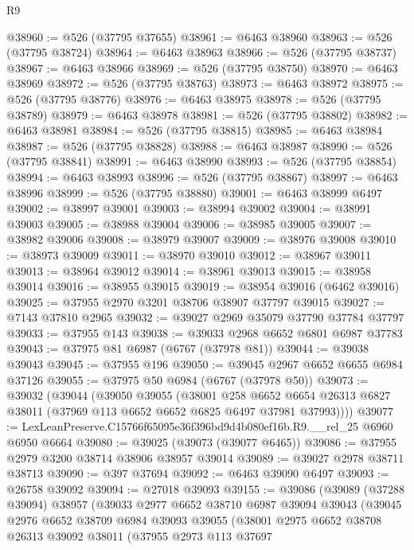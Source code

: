 \begin{lexlean}{R9}
\begin{coremodule}
@38960 := @526 (@37795 @37655)
@38961 := @6463 @38960
@38963 := @526 (@37795 @38724)
@38964 := @6463 @38963
@38966 := @526 (@37795 @38737)
@38967 := @6463 @38966
@38969 := @526 (@37795 @38750)
@38970 := @6463 @38969
@38972 := @526 (@37795 @38763)
@38973 := @6463 @38972
@38975 := @526 (@37795 @38776)
@38976 := @6463 @38975
@38978 := @526 (@37795 @38789)
@38979 := @6463 @38978
@38981 := @526 (@37795 @38802)
@38982 := @6463 @38981
@38984 := @526 (@37795 @38815)
@38985 := @6463 @38984
@38987 := @526 (@37795 @38828)
@38988 := @6463 @38987
@38990 := @526 (@37795 @38841)
@38991 := @6463 @38990
@38993 := @526 (@37795 @38854)
@38994 := @6463 @38993
@38996 := @526 (@37795 @38867)
@38997 := @6463 @38996
@38999 := @526 (@37795 @38880)
@39001 := @6463 @38999 @6497
@39002 := @38997 @39001
@39003 := @38994 @39002
@39004 := @38991 @39003
@39005 := @38988 @39004
@39006 := @38985 @39005
@39007 := @38982 @39006
@39008 := @38979 @39007
@39009 := @38976 @39008
@39010 := @38973 @39009
@39011 := @38970 @39010
@39012 := @38967 @39011
@39013 := @38964 @39012
@39014 := @38961 @39013
@39015 := @38958 @39014
@39016 := @38955 @39015
@39019 := @38954 @39016 (@6462 @39016)
@39025 := @37955 @2970 @3201 @38706 @38907 @37797 @39015
@39027 := @7143 @37810 @2965
@39032 := @39027 @2969 @35079 @37790 @37784 @37797
@39033 := @37955 @143
@39038 := @39033 @2968 @6652 @6801 @6987 @37783
@39043 := @37975 @81 @6987 (@6767 (@37978 @81))
@39044 := @39038 @39043
@39045 := @37955 @196
@39050 := @39045 @2967 @6652 @6655 @6984 @37126
@39055 := @37975 @50 @6984 (@6767 (@37978 @50))
@39073 := @39032
    (@39044
      (@39050
        @39055
        (@38001
          @258
          @6652
          @6654
          @26313
          @6827
          @38011
          (@37969 @113 @6652 @6652 @6825 @6497 @37981 @37993))))
@39077 := LexLeanPreserve.C15766f65095e36f396bd9d4b080ef16b.R9.__rel_25 @6960 @6950 @6664
@39080 := @39025 (@39073 (@39077 @6465))
@39086 := @37955 @2979 @3200 @38714 @38906 @38957 @39014
@39089 := @39027 @2978 @38711 @38713
@39090 := @397 @37694
@39092 := @6463 @39090 @6497
@39093 := @26758 @39092
@39094 := @27018 @39093
@39155 := @39086
    (@39089
      (@37288 @39094)
      @38957
      (@39033
        @2977
        @6652
        @38710
        @6987
        @39094
        @39043
        (@39045
          @2976
          @6652
          @38709
          @6984
          @39093
          @39055
          (@38001
            @2975
            @6652
            @38708
            @26313
            @39092
            @38011
            (@37955
              @2973
              @113
              @37697

\end{coremodule}
\end{lexlean}
